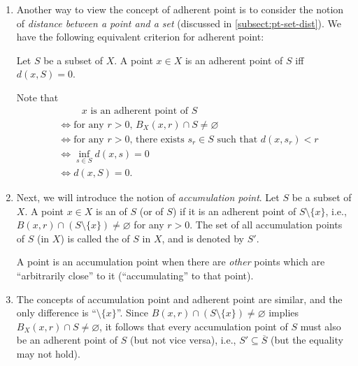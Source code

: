 \begin{enumerate}
\item Another way to view the concept of adherent point is to consider the
notion of \emph{distance between a point and a set} (discussed in
\cref{subsect:pt-set-dist}). We have the following equivalent criterion for
adherent point:
\begin{proposition}
\label{prp:adherent-zero-dist-from-set}
Let \(S\) be a subset of \(X\). A point \(x\in X\) is an adherent point of
\(S\) iff \(d(x,S)=0\).
\end{proposition}
\begin{pf}
Note that
\begin{align*}
&\hspace{1cm}\text{\(x\) is an adherent point of \(S\)}\\
&\iff \text{for any \(r>0\), \(B_X(x,r)\cap S\ne\varnothing\)}\\
&\iff\text{for any \(r>0\), there exists \(s_r\in S\) such that \(d(x,s_r)<r\)}\\
&\iff \inf_{s\in S}d(x,s)=0\\
&\iff d(x,S)=0.
\end{align*}
\end{pf}

\item Next, we will introduce the notion of \emph{accumulation point}. Let
\(S\) be a subset of \(X\). A point \(x\in X\) is an of \(S\) (or  of \(S\)) if it is an adherent point of
\(S\setminus\{x\}\), i.e., \(B(x,r)\cap(S\setminus\{x\})\ne\varnothing\) for
any \(r>0\). The set of all accumulation points of \(S\) (in \(X\)) is called
the  of \(S\) in \(X\), and is denoted by \(S'\).


\begin{intuition}
A point is an accumulation point when there are \emph{other} points which are
``arbitrarily close'' to it (``accumulating'' to that point).
\begin{center}
\end{center}
\end{intuition}


\item The concepts of accumulation point and adherent point are similar, and
the only difference is ``\(\setminus\{x\}\)''. Since
\(B(x,r)\cap(S\setminus\{x\})\ne\varnothing\) implies \(B_X(x,r)\cap
S\ne\varnothing\), it follows that every accumulation point of \(S\) must also
be an adherent point of \(S\) (but not vice versa), i.e., \(S'\subseteq
\overline{S}\) (but the equality may not hold).


\end{enumerate}
